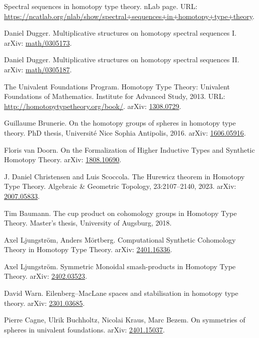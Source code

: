 \documentclass{amsart}
\theoremstyle{definition}
\begin{document}
\begin{thebibliography}{}

Spectral sequences in homotopy type theory. nLab page. URL: \url{https://ncatlab.org/nlab/show/spectral+sequences+in+homotopy+type+theory}.

Daniel Dugger. Multiplicative structures on homotopy spectral sequences I.
arXiv: \href{https://arxiv.org/abs/math/0305173}{math/0305173}.

Daniel Dugger. Multiplicative structures on homotopy spectral sequences II.
arXiv: \href{https://arxiv.org/abs/math/0305187}{math/0305187}.

The Univalent Foundations Program. Homotopy
Type Theory: Univalent Foundations of Mathematics. Institute for Advanced Study, 2013. URL: \url{http://homotopytypetheory.org/book/}. arXiv: \href{https://arxiv.org/abs/1308.0729}{1308.0729}.

Guillaume Brunerie. On the homotopy groups of spheres in homotopy type theory. PhD thesis,
Universit\'e Nice Sophia Antipolis, 2016. arXiv: \href{https://arxiv.org/abs/1606.05916}{1606.05916}.

Floris van Doorn. On the Formalization of Higher Inductive
Types and Synthetic Homotopy Theory.
arXiv: \href{https://arxiv.org/abs/1808.10690}{1808.10690}.

J. Daniel Christensen and Luis Scoccola. The Hurewicz theorem in Homotopy Type Theory. Algebraic
\& Geometric Topology, 23:2107–2140, 2023.
arXiv: \href{https://arxiv.org/abs/2007.05833}{2007.05833}.

Tim Baumann. The cup product on cohomology groups in Homotopy Type Theory. Master’s thesis,
University of Augsburg, 2018.

Axel Ljungstr\"om, Anders M\"ortberg. Computational Synthetic Cohomology Theory in Homotopy Type Theory.
arXiv: \href{https://arxiv.org/abs/2401.16336}{2401.16336}.

Axel Ljungstr\"om. Symmetric Monoidal smash-products in Homotopy Type Theory.
arXiv: \href{https://arxiv.org/abs/2402.03523}{2402.03523}.

David Warn. Eilenberg--MacLane spaces and stabilisation in homotopy type theory.
arXiv: \href{https://arxiv.org/abs/2301.03685}{2301.03685}.

Pierre Cagne, Ulrik Buchholtz, Nicolai Kraus, Marc Bezem. On symmetries of spheres in univalent foundations.
arXiv: \href{https://arxiv.org/abs/2401.15037}{2401.15037}.


\end{thebibliography}
\end{document}
